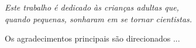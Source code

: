 \documentclass[
	12pt,				%
	openright,			%
	oneside,			%
	a4paper,			%
	english,			%
	french,				%
	spanish,			%
	brazil				%
	]{abntex2}
\begin{document}
    
        

      
  

\begin{dedicatoria}
   \vspace*{\fill}
   \centering
   \noindent
   \textit{Este trabalho é dedicado às crianças adultas que,\\
   quando pequenas, sonharam em se tornar cientistas.} \vspace*{\fill}
\end{dedicatoria}

\begin{agradecimentos}
Os agradecimentos principais são direcionados ...

\end{agradecimentos}
\end{document}
